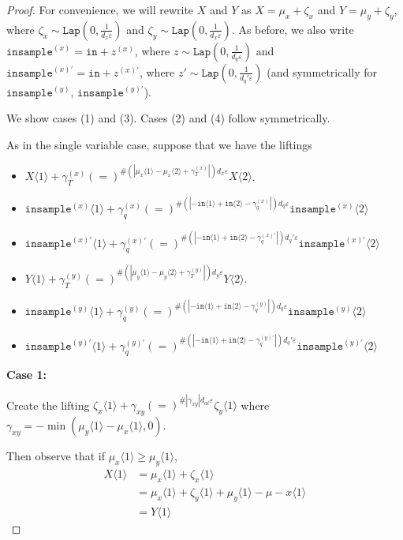 \documentclass[12pt]{article}
\newcommand{\brangle}[1]{\langle#1 \rangle}
\newcommand{\Lap}{\texttt{Lap}}
\theoremstyle{definition}
\begin{document}
\begin{proof}
    For convenience, we will rewrite $X$ and $Y$ as $X = \mu_x + \zeta_x$ and $Y = \mu_y + \zeta_y$, where $\zeta_x \sim\Lap(0, \frac{1}{d_x\varepsilon})$ and $\zeta_y \sim\Lap(0, \frac{1}{d_x\varepsilon})$. 
    As before, we also write $\texttt{insample}^{(x)} = \texttt{in} + z^{(x)}$, where $z\sim\Lap(0, \frac{1}{d_q\varepsilon})$ and $\texttt{insample}^{(x)\prime} = \texttt{in} + z^{(x)\prime}$, where $z'\sim\Lap(0, \frac{1}{d_q'\varepsilon})$ (and symmetrically for $\texttt{insample}^{(y)}$, $\texttt{insample}^{(y)\prime}$).

    We show cases (1) and (3). Cases (2) and (4) follow symmetrically. 

    As in the single variable case, suppose that we have the liftings
    \begin{itemize}
        \item $X\brangle{1}+\gamma_T^{(x)} (=)^{\#(|\mu_x\brangle{1}-\mu_x\brangle{2}+\gamma_T^{(x)}|)d_x\varepsilon}X\brangle{2}$.
        \item $\texttt{insample}^{(x)}\brangle{1} +\gamma_q^{(x)}{(=)}^{\#(|-\texttt{in}\brangle{1}+\texttt{in}\brangle{2}-\gamma_q^{(x)}|)d_q\varepsilon}\texttt{insample}^{(x)}\brangle{2}$
        \item $\texttt{insample}^{(x)\prime}\brangle{1} +\gamma_q^{(x)\prime}{(=)}^{\#(|-\texttt{in}\brangle{1}+\texttt{in}\brangle{2}-\gamma_q^{(x)\prime}|)d_q'\varepsilon}\texttt{insample}^{(x)\prime}\brangle{2}$
        \item $Y\brangle{1}+\gamma_T^{(y)} (=)^{\#(|\mu_y\brangle{1}-\mu_y\brangle{2}+\gamma_T^{(y)}|)d_y\varepsilon}Y\brangle{2}$.
        \item $\texttt{insample}^{(y)}\brangle{1} +\gamma_q^{(y)}{(=)}^{\#(|-\texttt{in}\brangle{1}+\texttt{in}\brangle{2}-\gamma_q^{(y)}|)d_q\varepsilon}\texttt{insample}^{(y)}\brangle{2}$
        \item $\texttt{insample}^{(y)\prime}\brangle{1} +\gamma_q^{(y)\prime}{(=)}^{\#(|-\texttt{in}\brangle{1}+\texttt{in}\brangle{2}-\gamma_q^{(y)\prime}|)d_q'\varepsilon}\texttt{insample}^{(y)\prime}\brangle{2}$
    \end{itemize}

    \textbf{Case 1:}

    Create the lifting $\zeta_x\brangle{1} +\gamma_{xy}(=)^{\#|\gamma_{xy}|d_{at}\varepsilon}\zeta_y\brangle{1}$ where $\gamma_{xy} = -\min(\mu_y\brangle{1}-\mu_x\brangle{1}, 0)$. 

    Then observe that if $\mu_x\brangle{1}\geq \mu_y\brangle{1}$, \begin{align*}
        X\brangle{1}&= \mu_x\brangle{1} + \zeta_x\brangle{1}\\
        &= \mu_x\brangle{1} + \zeta_y\brangle{1}+\mu_y\brangle{1}-\mu-x\brangle{1}\\
        &=Y\brangle{1}
    \end{align*}


\end{proof}
\end{document}
